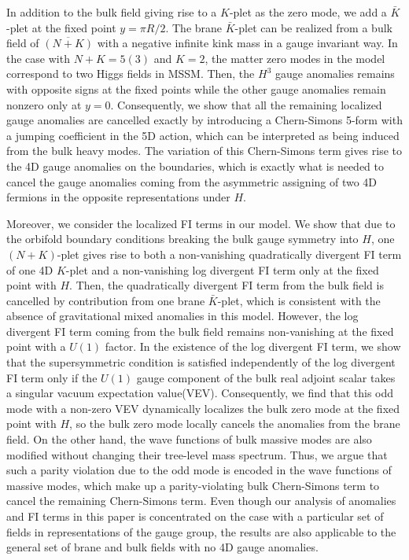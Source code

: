 \documentclass[a4paper,12pt]{article}
\begin{document}
In addition to the bulk field giving rise to a $K$-plet as the zero mode,
we add a $\bar K$-plet at the fixed point $y=\pi R/2$. 
The brane $\bar K$-plet can be realized from a bulk field of 
$\overline{(N+K)}$
with a negative infinite kink mass in a gauge invariant way. 
In the case with $N+K=5(3)$ and $K=2$, the matter zero modes in the model 
correspond to two Higgs fields in MSSM.
Then, 
the $H^3$ gauge anomalies remains with opposite signs at the fixed points
while the other gauge anomalies remain nonzero only at $y=0$.
Consequently, we show that all the remaining localized gauge anomalies 
are cancelled exactly by
introducing a Chern-Simons 5-form with a jumping coefficient in the 5D 
action, which can be interpreted as being induced from the bulk heavy 
modes\cite{ch,ah,pilo}. 
The variation of this Chern-Simons term gives rise to the 4D gauge 
anomalies on the boundaries, which is exactly what is needed to cancel the 
gauge anomalies coming from the asymmetric assigning of two 4D fermions 
in the opposite representations under $H$. 

Moreover, we consider the localized FI terms in our model.
We show that due to the orbifold boundary conditions breaking the bulk gauge
symmetry into $H$, one $(N+K)$-plet gives rise to both a non-vanishing
quadratically divergent FI term of one 4D $K$-plet and
a non-vanishing log divergent FI term only at the fixed point with $H$.
Then, the quadratically divergent FI term from the bulk field
is cancelled by contribution from one brane $\bar K$-plet,
which is consistent with the absence of gravitational
mixed anomalies in this model. However, the log divergent
FI term coming from the bulk field remains non-vanishing at the fixed point
with a $U(1)$ factor.
In the existence of the log divergent FI term,
we show that the supersymmetric condition is satisfied independently of
the log divergent FI term only if the $U(1)$ gauge component of the
bulk real adjoint scalar takes a singular vacuum expectation value(VEV).
Consequently, we find that this odd mode with a non-zero VEV dynamically
localizes the bulk zero mode at the fixed point with $H$, so the bulk zero mode
locally cancels the anomalies from the brane field.  
On the other hand, the wave functions of bulk massive modes are also modified 
without changing their tree-level mass spectrum.
Thus, we argue that
such a parity violation due to the odd mode 
is encoded in the wave functions of massive modes,
which make up a parity-violating bulk Chern-Simons term to cancel 
the remaining Chern-Simons term.
Even though our analysis of anomalies and FI terms in this paper 
is concentrated on the case 
with a particular set of fields in representations of the gauge group, 
the results are also applicable to the general set of brane and bulk fields 
with no 4D gauge anomalies.  
\end{document}
